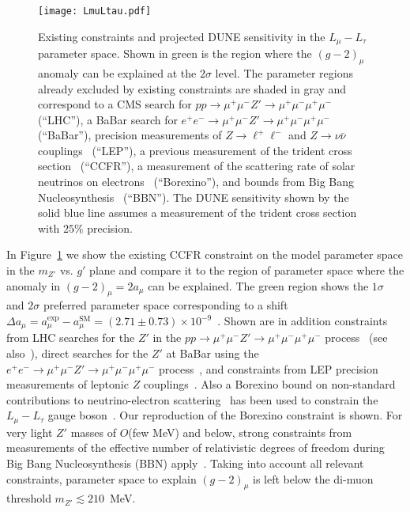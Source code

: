 \begin{figure}[tb!] \centering
\texttt{[image: LmuLtau.pdf]}
\caption[Existing constraints and projected sensitivity in the $L_\mu - L_\tau$ parameter space]{Existing constraints and projected DUNE sensitivity in the $L_\mu - L_\tau$ parameter space. Shown in green is the region where the $(g-2)_\mu$ anomaly can be explained at the $2\sigma$ level. The parameter regions already excluded by existing constraints are shaded in gray and correspond to a CMS search for $pp \to \mu^+\mu^- Z' \to \mu^+\mu^-\mu^+\mu^-$~\cite{Sirunyan:2018nnz} (``LHC''), a BaBar search for $e^+e^- \to \mu^+\mu^- Z' \to \mu^+\mu^-\mu^+\mu^-$~\cite{TheBABAR:2016rlg} (``BaBar''), precision measurements of $Z \to \ell^+ \ell^-$ and $Z \to \nu\bar\nu$ couplings~\cite{ALEPH:2005ab,Altmannshofer:2014cfa} (``LEP''), a previous measurement of the trident cross section~\cite{Mishra:1991bv,Altmannshofer:2014pba} (``CCFR''), a measurement of the scattering rate of solar neutrinos on electrons~\cite{Bellini:2011rx,Harnik:2012ni,Agostini:2017ixy} (``Borexino''), and bounds from Big Bang Nucleosynthesis~\cite{Ahlgren:2013wba,Kamada:2015era} (``BBN''). The DUNE sensitivity shown by the solid blue line assumes a measurement of the trident cross section with $25\%$ precision.}
\label{fig:LmuLtau}
\end{figure}

In Figure~\ref{fig:LmuLtau} we show the existing CCFR constraint on the model parameter space in the $m_{Z'}$ vs. $g'$ plane and compare it to the region of parameter space where the anomaly in $(g-2)_\mu = 2 a_\mu$ can be explained. The green region shows the $1\sigma$ and $2\sigma$ preferred parameter space corresponding to a shift $\Delta a_\mu = a_\mu^\text{exp}-a_\mu^\text{SM} = (2.71 \pm 0.73) \times 10^{-9}$~\cite{Keshavarzi:2018mgv}.
Shown are in addition constraints from LHC searches for the $Z'$ in the $pp \to \mu^+\mu^- Z' \to \mu^+\mu^-\mu^+\mu^-$ process~\cite{Sirunyan:2018nnz} (see also~\cite{Altmannshofer:2014pba}), direct searches for the $Z'$ at BaBar using the $e^+e^- \to \mu^+\mu^- Z' \to \mu^+\mu^-\mu^+\mu^-$ process~\cite{TheBABAR:2016rlg}, and constraints from LEP precision measurements of leptonic $Z$ couplings~\cite{ALEPH:2005ab,Altmannshofer:2014cfa}.  
Also a Borexino bound on non-standard contributions to neutrino-electron scattering~\cite{Harnik:2012ni,Bellini:2011rx,Agostini:2017ixy} has been used to constrain the $L_\mu - L_\tau$ gauge boson~\cite{Kamada:2015era,Araki:2015mya,Kamada:2018zxi}. Our reproduction of the Borexino constraint is shown. 
For very light $Z'$ masses of $O$(few MeV) and below, strong constraints from measurements of the effective number of relativistic degrees of freedom during Big Bang Nucleosynthesis (BBN) apply~\cite{Ahlgren:2013wba,Kamada:2015era}.
Taking into account all relevant constraints, parameter space to explain $(g-2)_\mu$ is left below the di-muon threshold $m_{Z'} \lesssim 210$~MeV.

